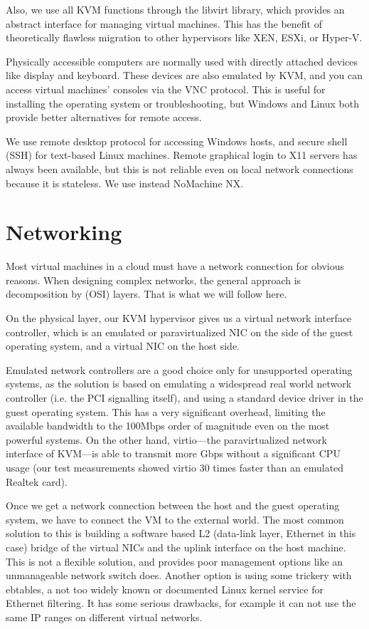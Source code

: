 \documentclass{llncs}
\begin{document}
Also, we use all KVM functions through the libvirt library, which provides an abstract interface for managing virtual machines.\cite{victoria2009creating} This has the benefit of theoretically flawless migration to other hypervisors like XEN, ESXi, or Hyper-V.\cite{bolte2010non}

Physically accessible computers are normally used with directly attached devices like display and keyboard. These devices are also emulated by KVM, and you can access virtual machines' consoles via the VNC protocol. This is useful for installing the operating system or troubleshooting, but Windows and Linux both provide better alternatives for remote access.

We use remote desktop protocol for accessing Windows hosts, and secure shell (SSH) for text-based Linux machines. Remote graphical login to X11 servers has always been available, but this is not reliable even on local network connections because it is stateless. We use instead NoMachine NX\cite{pinzari2003introduction}.
   
   \section{Networking}
   Most virtual machines in a cloud must have a network connection for obvious reasons.  When designing complex networks, the general approach is decomposition by (OSI) layers. That is what we will follow here.

   On the physical layer, our KVM hypervisor gives us a virtual network interface controller, which is an emulated or paravirtualized NIC on the side of the guest operating system, and a virtual NIC on the host side.

   Emulated network controllers are a good choice only for unsupported operating systems, as the solution is based on emulating a widespread real world network controller (i.e. the PCI signalling itself), and using a standard device driver in the guest operating system. This has a very significant overhead, limiting the available bandwidth to the 100Mbps order of magnitude even on the most powerful systems. On the other hand, virtio---the paravirtualized network interface of KVM---is able to transmit more Gbps without a significant CPU usage (our test measurements showed virtio 30 times faster than an emulated Realtek card).

   Once we get a network connection between the host and the guest operating system, we have to connect the VM to the external world. The most common solution to this is building a software based L2 (data-link layer, Ethernet in this case) bridge of the virtual NICs and the uplink interface on the host machine. This is not a flexible solution, and provides poor management options like an unmanageable network switch does. Another option is using some trickery with ebtables, a not too widely known or documented Linux kernel service for Ethernet filtering. It has some serious drawbacks, for example it can not use the same IP ranges on different virtual networks.
\end{document}
